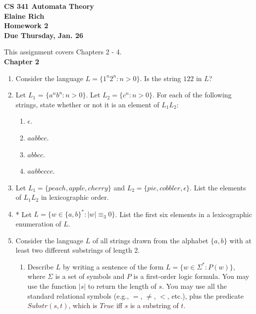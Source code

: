 \documentclass[10pt]{article}
\newcommand{\card}[1]{\left| #1 \right|}
\newcommand{\chtitle}[1]{\noindent \vspace{5mm}\textbf{Chapter #1}\vspace{3mm}}
\begin{document}
\begin{center}
\textbf{
CS 341 Automata Theory \\
Elaine Rich \\
Homework 2 \\
Due Thursday, Jan. 26}
\end{center}
This assignment covers Chapters 2 - 4. \\

\chtitle{2}

\begin{enumerate}


\item
Consider the language $L = \{1^n2^n: n > 0\}$.  Is the string $122$ in $L$?


\item
Let $L_1$ = $\{a^nb^n: n > 0\}$.  Let $L_2 = \{c^n: n > 0\}$.  For each of the following strings, state whether or not it is an element of $L_1L_2$:
\begin{enumerate}

\item
$\epsilon$.

\item
$aabbcc$.

\item
$abbcc$.

\item
$aabbcccc$.
\end{enumerate}


\item
Let $L_1 = \{peach, apple, cherry\}$ and $L_2 = \{pie, cobbler, \epsilon\}$.  List the elements of $L_1L_2$ in lexicographic order.


\item
* Let $L = \{w \in \{a, b\}^* : \card{w} \equiv _3 0\}$.  List the first six elements in a lexicographic enumeration of $L$.


\item
Consider the language $L$ of all strings drawn from the alphabet $\{a, b\}$ with at least two different substrings of length 2.
\begin{enumerate}

\item
Describe $L$ by writing a sentence of the form $L = \{w \in \Sigma ^* : P(w)\}$, where $\Sigma$ is a set of symbols and $P$ is a first-order logic formula.  You may use the function $\card{s}$ to return the length of $s$.  You may use all the standard relational symbols (e.g., $=$,  $\neq$, $<$, etc.), plus the predicate  $Substr(s,  t)$, which is $True$ iff $s$ is a substring of $t$.


\end{enumerate}
\end{enumerate}
\end{document}
